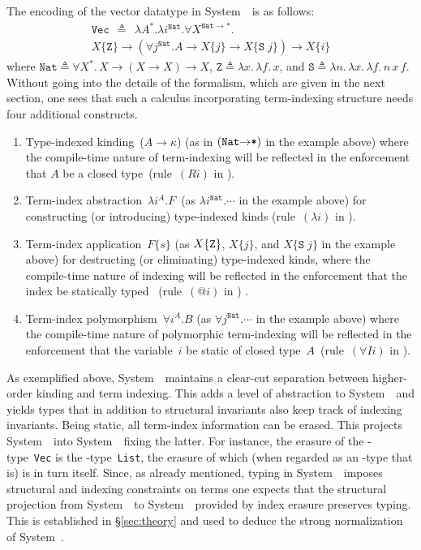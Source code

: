 The encoding of the vector datatype in System~\Fi\ is as follows: 
\vspace*{-5pt}
\begin{multline*}\!\!\!\!\!\!\!
\texttt{{Vec}}\:\:\triangleq\:\:\lambda A^\mathtt{*}.\lambda
i^{\texttt{{Nat}}}.  \forall X^{\texttt{{Nat}}\to\mathtt{*}}.\\
X\{\texttt{{Z}}\}\to
(\forall j^{\texttt{{Nat}}}.A\to X\{j\}\to X\{\texttt{{S}}\; j\})\to X\{i\}
\end{multline*}
where $\texttt{{Nat}} \triangleq \forall X^\mathtt{*}.\, X\to(X\to X)\to
X$, $\texttt Z \triangleq \lambda x.\,\lambda f.\, x$, and
$\texttt S \triangleq \lambda n.\,\lambda x.\,\lambda f.\, n\, x\, f$.
Without going into the details of the formalism, which are given in the
next section, one sees that such a calculus incorporating term-indexing
structure needs four additional constructs.
\begin{enumerate}
\item 
  Type-indexed kinding~($A\to\kappa$) (as in $(\texttt{{Nat}\ensuremath{\to}*})$
  in the example above) where the compile-time nature of term-indexing
  will be reflected in the enforcement that $A$ be a closed
  type~(rule~$(Ri)$ in ).

\item 
  Term-index abstraction~$\lambda i^A.F$~(as $\lambda
  i^{\texttt{{Nat}}}.\cdots$ in the example above) for constructing (or
  introducing) type-indexed kinds (rule~$(\lambda i)$ in
  ).  

\item 
  Term-index application~$F\{s\}$ (as $X\{{\tt Z}\}$, $X\{j\}$, and
  $X\{\texttt{S}\;j\}$ in the example above) for destructing (or
  eliminating) type-indexed kinds, where the compile-time nature of
  indexing will be reflected in the enforcement that the index be
  statically typed%
~(rule~$(@i)$ in ) .

\item 
  Term-index polymorphism~$\forall i^A.B$ (as $\forall
  j^{\texttt{{Nat}}}.\cdots$ in the example above) where the compile-time
  nature of polymorphic term-indexing will be reflected in the enforcement
  that the variable~$i$ be static of closed type~$A$~(rule~$(\forall
  Ii)$ in ).
\end{enumerate}

As exemplified above, System~\Fi\ maintains a clear-cut separation between
higher-order kinding and term indexing.  This adds a level of abstraction
to System~\Fw\ and yields types that in addition to structural invariants
also keep track of indexing invariants.  Being static, all term-index
information can be erased.  This projects System~\Fi\ into System~\Fw\
fixing the latter.  For instance, the erasure of the \Fi-type~\texttt{Vec}
is the \Fw-type~\texttt{List}, the erasure of which (when regarded as an
\Fi-type that is) is in turn itself.  Since, as already mentioned, typing
in System~\Fi\ imposes structural and indexing constraints on terms one
expects that the structural projection from System~\Fi\ to System~\Fw\
provided by index erasure preserves typing.  This is established in
\S\ref{sec:theory} and used to deduce the strong normalization of
System~\Fi.

